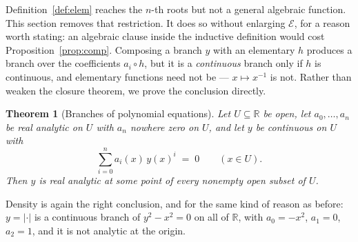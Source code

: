 \documentclass[11pt,oneside]{article}
\newtheorem{theorem}{Theorem}[section]
\theoremstyle{definition}
\theoremstyle{remark}
\newcommand{\R}{\mathbb R}
\newcommand{\Elem}{\mathcal E}
\begin{document}
Definition~\ref{def:elem} reaches the $n$-th roots but not a general algebraic
function.  This section removes that restriction.  It does so without
enlarging $\Elem$, for a reason worth stating: an algebraic clause inside the
inductive definition would cost Proposition~\ref{prop:comp}.  Composing a
branch $y$ with an elementary $h$ produces a branch over the coefficients
$a_i\circ h$, but it is a \emph{continuous} branch only if $h$ is continuous,
and elementary functions need not be --- $x\mapsto x^{-1}$ is not.  Rather than
weaken the closure theorem, we prove the conclusion directly.

\begin{theorem}[Branches of polynomial equations]\label{thm:algebraic}
Let $U\subseteq\R$ be open, let $a_0,\dots,a_n$ be real analytic on $U$ with
$a_n$ nowhere zero on $U$, and let $y$ be continuous on $U$ with
\[
  \sum_{i=0}^{n} a_i(x)\,y(x)^i \;=\; 0 \qquad (x\in U).
\]
Then $y$ is real analytic at some point of every nonempty open subset of $U$.
\end{theorem}

Density is again the right conclusion, and for the same kind of reason as
before: $y=|\cdot|$ is a continuous branch of $y^2-x^2=0$ on all of $\R$, with
$a_0=-x^2$, $a_1=0$, $a_2=1$, and it is not analytic at the origin.
\end{document}
